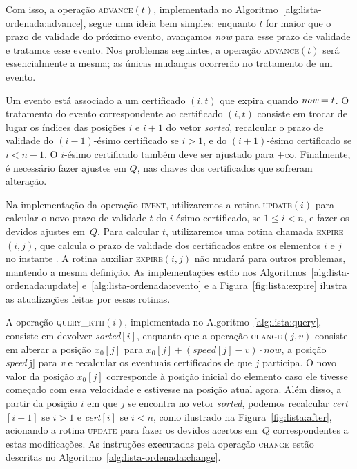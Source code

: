 Com isso, a operação \textsc{advance}$(t)$, implementada no
Algoritmo~\ref{alg:lista-ordenada:advance}, segue uma ideia bem simples: enquanto
$t$ for maior que o prazo de validade do próximo evento, avançamos
\textit{now} para esse prazo de validade e tratamos esse evento.
Nos problemas seguintes, a operação \textsc{advance}$(t)$ será essencialmente a
mesma;
as únicas mudanças ocorrerão no tratamento de um evento.



Um evento está associado a um certificado $(i, t)$ que expira quando
$\textit{now} = t$.
O tratamento do evento correspondente ao certificado $(i, t)$ consiste em trocar de lugar os
índices das posições $i$ e $i + 1$ do vetor \textit{sorted}, recalcular o prazo de validade do
$(i-1)$-ésimo certificado se $i > 1$, e do $(i + 1)$-ésimo
certificado se $i < n - 1$.
O $i$-ésimo certificado também deve ser ajustado para $+\infty$.
Finalmente, é necessário fazer ajustes em $Q$, nas chaves dos certificados que sofreram
alteração.

Na implementação da operação \textsc{event}, utilizaremos a rotina
\textsc{update}$(i)$ para calcular o novo prazo de validade $t$ do
$i$-ésimo certificado, se $1 \leq i < n$, e fazer os devidos ajustes
em~$Q$.
Para calcular $t$, utilizaremos uma rotina chamada \textsc{expire}$(i,
j)$, que calcula o prazo de validade dos certificados entre os
elementos $i$ e $j$ no instante \now.
A rotina auxiliar \textsc{expire}$(i, j)$ não mudará para outros problemas, mantendo a
mesma definição.
As implementações estão nos Algoritmos~\ref{alg:lista-ordenada:update}
e~\ref{alg:lista-ordenada:evento} e a Figura~\ref{fig:lista:expire}
ilustra as atualizações feitas por essas rotinas.







A operação \textsc{query\_kth}$(i)$, implementada no Algoritmo~\ref{alg:lista:query}, consiste em
devolver \textit{sorted}$[i]$, enquanto que a operação \textsc{change}$(j, v)$ consiste em alterar
a posição $x_0[j]$ para $x_0[j] + (\textit{speed}[j] - v)\cdot now$,
a posição \textit{speed}[j] para \textit{v} e recalcular os
eventuais certificados de que $j$ participa.
O novo valor da posição $x_0[j]$ corresponde à posição inicial do elemento caso ele tivesse
começado com essa velocidade e estivesse na posição atual agora.
Além disso, a partir da posição $i$ em que $j$ se encontra no vetor
\textit{sorted}, podemos recalcular \textit{cert}$[i - 1]$ se $i >
1$ e \textit{cert}$[i]$ se $i < n$, como ilustrado na Figura~\ref{fig:lista:after}, acionando a
rotina \textsc{update} para fazer
os devidos acertos em~$Q$ correspondentes a estas modificações.
As instruções executadas pela operação \textsc{change} estão descritas
no Algoritmo~\ref{alg:lista-ordenada:change}.

